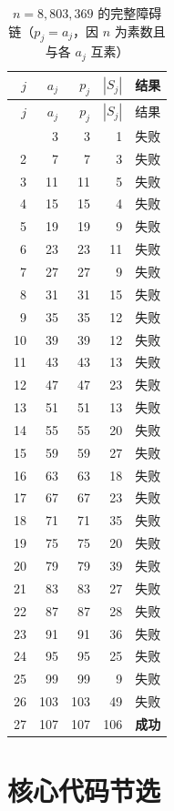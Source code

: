 \documentclass[11pt,a4paper]{ctexart}
\theoremstyle{definition}
\theoremstyle{remark}
\begin{document}
\begin{longtable}{@{}rrrrl@{}}
\caption{$n=8{,}803{,}369$ 的完整障碍链（$p_j=a_j$，因 $n$ 为素数且与各
$a_j$ 互素）}\label{tab:fullchain}\\
\toprule
$j$ & $a_j$ & $p_j$ & $|S_j|$ & 结果 \\
\midrule
\endfirsthead
\toprule
$j$ & $a_j$ & $p_j$ & $|S_j|$ & 结果 \\
\midrule
\endhead
\bottomrule
\endfoot
1 & 3 & 3 & 1 & 失败 \\
2 & 7 & 7 & 3 & 失败 \\
3 & 11 & 11 & 5 & 失败 \\
4 & 15 & 15 & 4 & 失败 \\
5 & 19 & 19 & 9 & 失败 \\
6 & 23 & 23 & 11 & 失败 \\
7 & 27 & 27 & 9 & 失败 \\
8 & 31 & 31 & 15 & 失败 \\
9 & 35 & 35 & 12 & 失败 \\
10 & 39 & 39 & 12 & 失败 \\
11 & 43 & 43 & 13 & 失败 \\
12 & 47 & 47 & 23 & 失败 \\
13 & 51 & 51 & 13 & 失败 \\
14 & 55 & 55 & 20 & 失败 \\
15 & 59 & 59 & 27 & 失败 \\
16 & 63 & 63 & 18 & 失败 \\
17 & 67 & 67 & 23 & 失败 \\
18 & 71 & 71 & 35 & 失败 \\
19 & 75 & 75 & 20 & 失败 \\
20 & 79 & 79 & 39 & 失败 \\
21 & 83 & 83 & 27 & 失败 \\
22 & 87 & 87 & 28 & 失败 \\
23 & 91 & 91 & 36 & 失败 \\
24 & 95 & 95 & 25 & 失败 \\
25 & 99 & 99 & 9 & 失败 \\
26 & 103 & 103 & 49 & 失败 \\
27 & 107 & 107 & 106 & \textbf{成功} \\
\end{longtable}

\section{核心代码节选}
\end{document}
